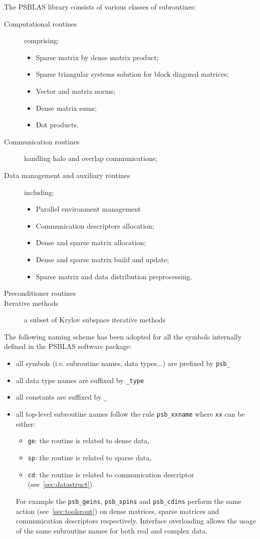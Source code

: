The PSBLAS library consists of various classes of subroutines:
\begin{description}
\item[Computational routines] comprising:
\begin{itemize}
\item Sparse matrix by dense matrix product; 
\item Sparse triangular
systems solution for block diagonal matrices;
\item Vector and matrix norms;
\item Dense matrix sums;
\item Dot products.
\end{itemize} 
\item[Communication routines] handling halo and overlap
  communications;
\item[Data management and auxiliary routines] including:
\begin{itemize}
\item Parallel environment management
\item Communication descriptors allocation;
\item Dense and sparse matrix allocation;
\item Dense and sparse matrix build and update;
\item Sparse matrix and data distribution preprocessing.
\end{itemize} 
\item[Preconditioner routines]
\item[Iterative methods] a subset of Krylov subspace iterative
  methods
\end{description}
The following naming scheme has been adopted for all the symbols
internally defined in the PSBLAS software package:
\begin{itemize}
\item all symbols (i.e. subroutine names, data types...) are
  prefixed by \verb|psb_| 
\item all data type names are suffixed by \verb|_type|
\item all constants are suffixed by \verb|_|
\item all top-level subroutine names follow the rule \verb|psb_xxname| where
  \verb|xx| can be either:
  \begin{itemize}
  \item \verb|ge|: the routine is related to dense data, 
  \item \verb|sp|: the routine is related to sparse data, 
  \item \verb|cd|: the routine is related to communication descriptor
        (see~\ref{sec:datastruct}).
  \end{itemize}
  For example the \verb|psb_geins|, \verb|psb_spins| and
  \verb|psb_cdins| perform the same action (see~\ref{sec:toolsrout}) on
  dense matrices, sparse matrices and communication descriptors
  respectively.
  Interface overloading allows the usage of the same subroutine
  names  for both real and complex data.
\end{itemize}
